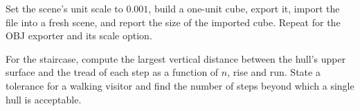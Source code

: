\begin{exercise}
Set the scene's unit scale to $0.001$, build a one-unit cube, export it, import the file into a fresh scene, and report the size of the imported cube. Repeat for the OBJ exporter and its scale option.
\end{exercise}

\begin{exercise}
For the staircase, compute the largest vertical distance between the hull's upper surface and the tread of each step as a function of $n$, rise and run. State a tolerance for a walking visitor and find the number of steps beyond which a single hull is acceptable.
\end{exercise}
